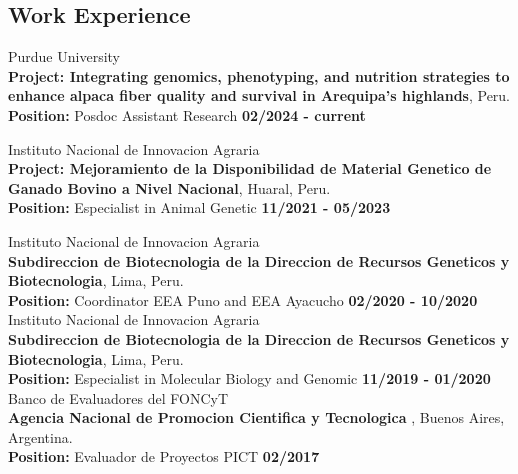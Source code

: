 \documentclass[margin,line,10pt]{res}
\begin{document}
\begin{resume}
\section{\sc Work \phantom{1cm} Experience}

\vspace{0.5cm}

Purdue University\\
{\bf Project: Integrating genomics, phenotyping, and nutrition strategies to enhance alpaca fiber quality and survival in Arequipa’s highlands}, Peru.\\
\vspace{-.3cm}
\textbf{Position:} Posdoc Assistant Research  \hfill {\bf 02/2024 - current}\\
\vspace{0.3cm}

\vspace{0.5cm}

Instituto Nacional de Innovacion Agraria\\
{\bf Project: Mejoramiento de la Disponibilidad de Material Genetico de Ganado Bovino a Nivel Nacional}, Huaral, Peru.\\
\vspace{-.3cm}
\textbf{Position:} Especialist in Animal Genetic  \hfill {\bf 11/2021 - 05/2023}\\
\vspace{0.3cm}

Instituto Nacional de Innovacion Agraria\\
{\bf Subdireccion de Biotecnologia de la Direccion de Recursos Geneticos y Biotecnologia}, Lima, Peru.\\
\vspace{-.3cm}
\textbf{Position:} Coordinator EEA Puno and EEA Ayacucho \hfill {\bf 02/2020 - 10/2020}\\

Instituto Nacional de Innovacion Agraria\\
{\bf Subdireccion de Biotecnologia de la Direccion de Recursos Geneticos y Biotecnologia}, Lima, Peru.\\
\vspace{-.3cm}
\textbf{Position:} Especialist in Molecular Biology and Genomic \hfill {\bf 11/2019 - 01/2020}\\

Banco de Evaluadores del FONCyT\\
{\bf Agencia Nacional de Promocion Cientifica y Tecnologica }, Buenos Aires, Argentina.\\
\vspace{-.3cm}
\textbf{Position:} Evaluador de Proyectos PICT \hfill {\bf 02/2017}\\


\end{resume}
\end{document}
